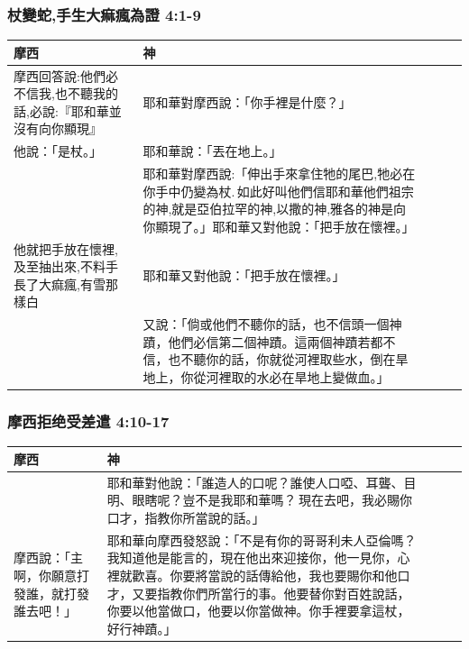 \subsubsection{杖變蛇,手生大痲瘋為證 4:1-9}
\begin{table}[H]
\begin{threeparttable}
\begin{tabular}{@{}p{}*{4}{L{\tabcolsep\relax}}@{}}
\toprule
摩西 &  神 \\\hline
摩西回答說:他們必不信我,也不聽我的話,必說:『耶和華並沒有向你顯現』&耶和華對摩西說：「你手裡是什麼？」\tabularnewline \hline
他說：「是杖。」&耶和華說：「丟在地上。」\tabularnewline\hline
\vspace{-.5cm}{他一丟下去，就變做蛇，摩西便跑開}&耶和華對摩西說:「伸出手來拿住牠的尾巴,牠必在你手中仍變為杖. 如此好叫他們信耶和華他們祖宗的神,就是亞伯拉罕的神,以撒的神,雅各的神是向你顯現了。」耶和華又對他說：「把手放在懷裡。」\tabularnewline\hline
他就把手放在懷裡,及至抽出來,不料手長了大痲瘋,有雪那樣白&耶和華又對他說：「把手放在懷裡。」\tabularnewline\hline
\vspace{-.55cm}{他就再把手放在懷裡，及至從懷裡抽出來，不料，手已經復原，與周身的肉一樣。}
&又說：「倘或他們不聽你的話，也不信頭一個神蹟，他們必信第二個神蹟。這兩個神蹟若都不信，也不聽你的話，你就從河裡取些水，倒在旱地上，你從河裡取的水必在旱地上變做血。」\tabularnewline\hline
\bottomrule
\end{tabular}
\end{threeparttable}
\end{table} 

\subsubsection{摩西拒绝受差遣 4:10-17}
\begin{table}[H]
\begin{threeparttable}
\begin{tabular}{@{}p{}*{4}{L{\tabcolsep\relax}}@{}}
\toprule
摩西 &  神 \\\hline
\vspace{-.65cm}{摩西對耶和華說：「主啊，我素日不是能言的人，就是從你對僕人說話以後，也是這樣。我本是拙口笨舌的。」}
&耶和華對他說：「誰造人的口呢？誰使人口啞、耳聾、目明、眼瞎呢？豈不是我耶和華嗎？ 現在去吧，我必賜你口才，指教你所當說的話。」 \tabularnewline\hline
摩西說：「主啊，你願意打發誰，就打發誰去吧！」
&耶和華向摩西發怒說：「不是有你的哥哥利未人亞倫嗎？我知道他是能言的，現在他出來迎接你，他一見你，心裡就歡喜。你要將當說的話傳給他，我也要賜你和他口才，又要指教你們所當行的事。他要替你對百姓說話，你要以他當做口，他要以你當做神。你手裡要拿這杖，好行神蹟。」\tabularnewline
\hline
\bottomrule
\end{tabular}
\end{threeparttable}
\end{table} 

